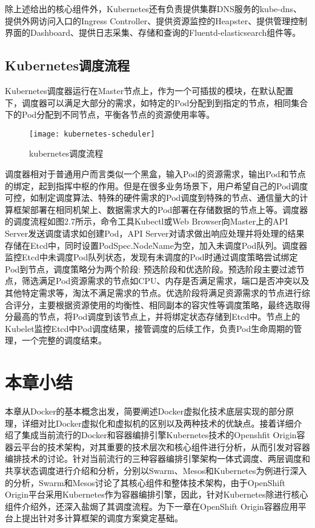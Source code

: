 除上述给出的核心组件外，Kubernetes还有负责提供集群DNS服务的kube-dns、提供外网访问入口的Ingress Controller、提供资源监控的Heapster、提供管理控制界面的Dashboard、提供日志采集、存储和查询的Fluentd-elasticsearch组件等。

\subsection{Kubernetes调度流程}
Kubernetes调度器运行在Master节点上，作为一个可插拔的模块，在默认配置下，调度器可以满足大部分的需求，如特定的Pod分配到到指定的节点，相同集合下的Pod分配到不同节点，平衡各节点的资源使用率等。
\begin{figure}[H] %
	\centering
	\texttt{[image: kubernetes-scheduler]}
	\caption{kubernetes调度流程}
\end{figure}
调度器相对于普通用户而言类似一个黑盒，输入Pod的资源需求，输出Pod和节点的绑定，起到指挥中枢的作用。但是在很多业务场景下，用户希望自己的Pod调度可控，如制定调度算法、特殊的硬件需求的Pod调度到特殊的节点、通信量大的计算框架部署在相同机架上、数据需求大的Pod部署在存储数据的节点上等。调度器的调度流程如图2.7所示，命令工具Kubectl或Web Browser向Master上的API Server发送调度请求如创建Pod，API Server对请求做出响应处理并将处理的结果存储在Etcd中，同时设置PodSpec.NodeName为空，加入未调度Pod队列。调度器监控Etcd中未调度Pod队列状态，发现有未调度的Pod时通过调度策略尝试绑定Pod到节点，调度策略分为两个阶段: 预选阶段和优选阶段。预选阶段主要过滤节点，筛选满足Pod资源需求的节点如CPU、内存是否满足需求，端口是否冲突以及其他特定需求等，淘汰不满足需求的节点。优选阶段将满足资源需求的节点进行综合评分，主要根据资源使用的均衡性、相同副本的容灾性等调度策略，最终选取得分最高的节点，将Pod调度到该节点上，并将绑定状态存储到Etcd中。节点上的Kubelet监控Etcd中Pod调度结果，接管调度的后续工作，负责Pod生命周期的管理，一个完整的调度结束。

\section{本章小结}
本章从Docker的基本概念出发，简要阐述Docker虚拟化技术底层实现的部分原理，详细对比Docker虚拟化和虚拟机的区别以及两种技术的优缺点。接着详细介绍了集成当前流行的Docker和容器编排引擎Kubernetes技术的Openshfit Origin容器云平台的技术架构，对其重要的技术层次和核心组件进行分析，从而引发对容器编排技术的讨论。针对当前流行的三种容器编排引擎架构一体式调度、两层调度和共享状态调度进行介绍和分析，分别以Swarm、Mesos和Kubernetes为例进行深入的分析，Swarm和Mesos讨论了其核心组件和整体技术架构，由于OpenShift Origin平台采用Kubernetes作为容器编排引擎，因此，针对Kubernetes除进行核心组件介绍外，还深入盐焗了其调度流程。为下一章在OpenShift Origin容器应用平台上提出针对多计算框架的调度方案奠定基础。




